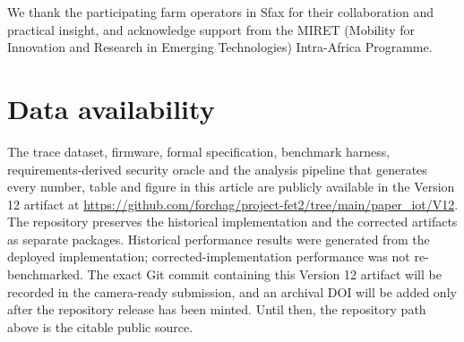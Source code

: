 \documentclass[a4paper,fleqn]{cas-dc}
\begin{document}
We thank the participating farm operators in Sfax for their collaboration and
practical insight, and acknowledge support from the MIRET (Mobility for
Innovation and Research in Emerging Technologies) Intra-Africa Programme.

\section*{Data availability}

The trace dataset, firmware, formal specification, benchmark harness,
requirements-derived security oracle and the analysis pipeline that
generates every number, table and figure in this article are publicly
available in the Version 12 artifact at
\url{https://github.com/forchag/project-fet2/tree/main/paper_iot/V12}.
The repository preserves the historical implementation and the corrected
artifacts as separate packages. Historical performance results were
generated from the deployed implementation; corrected-implementation
performance was not re-benchmarked. The exact Git commit containing this
Version 12 artifact will be recorded in the camera-ready submission, and
an archival DOI will be added only after the repository release has been
minted. Until then, the repository path above is the citable public source.

\clearpage


\end{document}
